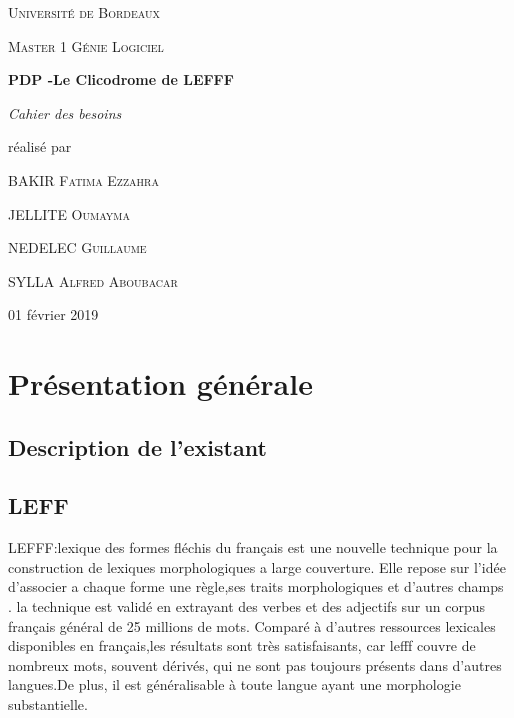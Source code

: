 \documentclass[12pt,a4paper]{article}
\begin{document}
\begin{titlepage}
\centering
{\scshape\LARGE Université de Bordeaux \par}
{\scshape\Large Master 1 Génie Logiciel  \par}
\vspace{3cm}

{\Huge\bfseries PDP -Le Clicodrome de LEFFF \par}
\vspace{0.5cm}
{\Large\itshape Cahier des besoins\par}

\vfill
réalisé par \par
BAKIR \textsc{Fatima Ezzahra} \par
JELLITE \textsc{Oumayma} \par
NEDELEC \textsc{Guillaume} \par
SYLLA  \textsc{Alfred Aboubacar} \par
\vfill

{\large 01 février 2019\par}

\end{titlepage}

\section{Présentation générale }

\subsection{Description de l'existant}

 \subsection*{\textbf{LEFF} }
\smallbreak LEFFF:lexique des formes fléchis du français est une nouvelle technique pour la construction de lexiques morphologiques a large couverture. Elle repose sur l'idée  d'associer a chaque forme une règle,ses traits morphologiques et d'autres champs .
\smallbreak la technique est validé  en extrayant des verbes et des adjectifs sur un corpus français général de 25 millions de mots. Comparé à d'autres ressources lexicales disponibles en français,les résultats sont très satisfaisants, car lefff couvre de nombreux mots, souvent dérivés, qui ne sont pas toujours présents dans d’autres langues.De plus, il est généralisable à toute langue ayant une morphologie substantielle.
\end{document}
